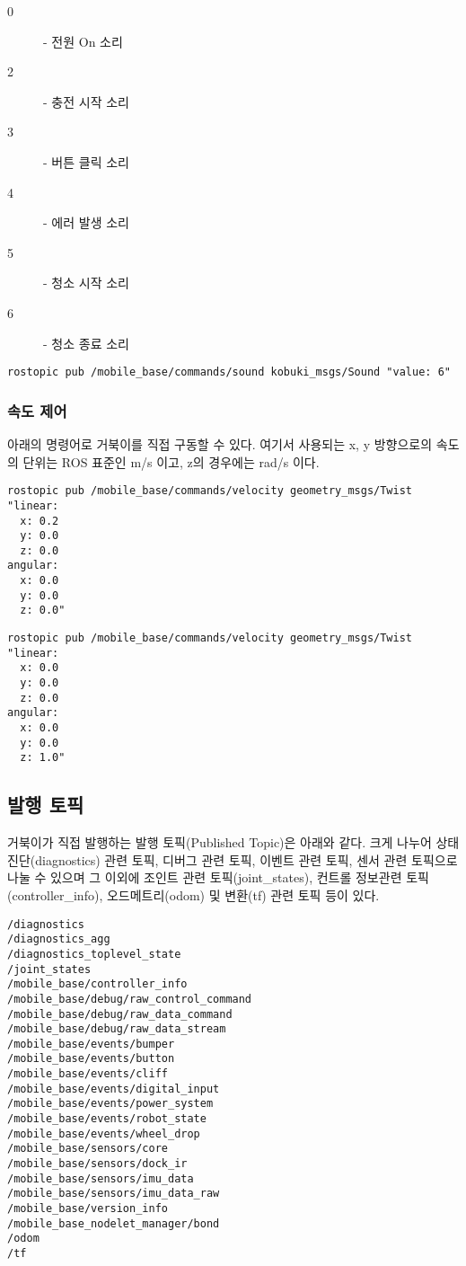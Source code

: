 \begin{description}
\item[0] - 전원 On 소리
\item[2] - 충전 시작  소리
\item[3] - 버튼 클릭 소리
\item[4] - 에러 발생 소리
\item[5] - 청소 시작 소리
\item[6] - 청소 종료 소리
\end{description}

\begin{lstlisting}[language=ROS]
rostopic pub /mobile_base/commands/sound kobuki_msgs/Sound "value: 6"
\end{lstlisting}


\subsubsection{속도 제어}

아래의 명령어로 거북이를 직접 구동할 수 있다. 여기서 사용되는 x, y 방향으로의 속도의 단위는 ROS 표준인 m/s 이고, z의 경우에는 rad/s 이다. 

\vspace{\baselineskip}
\begin{lstlisting}[language=ROS]
rostopic pub /mobile_base/commands/velocity geometry_msgs/Twist "linear:
  x: 0.2
  y: 0.0
  z: 0.0
angular:
  x: 0.0
  y: 0.0
  z: 0.0"
\end{lstlisting}

\begin{lstlisting}[language=ROS]
rostopic pub /mobile_base/commands/velocity geometry_msgs/Twist "linear:
  x: 0.0
  y: 0.0
  z: 0.0
angular:
  x: 0.0
  y: 0.0
  z: 1.0"
\end{lstlisting}

\subsection{발행 토픽}

거북이가 직접 발행하는 발행 토픽(Published Topic)은 아래와 같다. 크게 나누어 상태 진단(diagnostics) 관련 토픽, 디버그 관련 토픽, 이벤트 관련 토픽, 센서 관련 토픽으로 나눌 수 있으며 그 이외에 조인트 관련 토픽(joint\_states), 컨트롤 정보관련 토픽(controller\_info), 오드메트리(odom) 및 변환(tf) 관련 토픽 등이 있다.

\begin{lstlisting}[language=ROS]
/diagnostics
/diagnostics_agg
/diagnostics_toplevel_state
/joint_states
/mobile_base/controller_info
/mobile_base/debug/raw_control_command
/mobile_base/debug/raw_data_command
/mobile_base/debug/raw_data_stream
/mobile_base/events/bumper
/mobile_base/events/button
/mobile_base/events/cliff
/mobile_base/events/digital_input
/mobile_base/events/power_system
/mobile_base/events/robot_state
/mobile_base/events/wheel_drop
/mobile_base/sensors/core
/mobile_base/sensors/dock_ir
/mobile_base/sensors/imu_data
/mobile_base/sensors/imu_data_raw
/mobile_base/version_info
/mobile_base_nodelet_manager/bond
/odom
/tf
\end{lstlisting}

